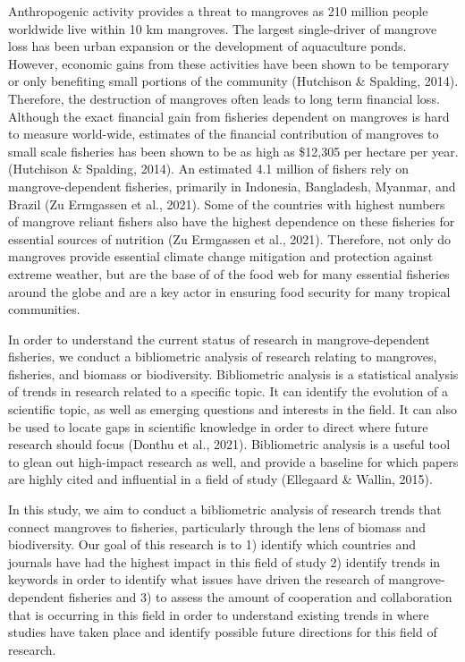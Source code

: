 \documentclass[
  12pt,
]{article}
\begin{document}
Anthropogenic activity provides a threat to mangroves as 210 million people worldwide live within 10 km mangroves. The largest single-driver of mangrove loss has been urban expansion or the development of aquaculture ponds. However, economic gains from these activities have been shown to be temporary or only benefiting small portions of the community (Hutchison \& Spalding, 2014). Therefore, the destruction of mangroves often leads to long term financial loss. Although the exact financial gain from fisheries dependent on mangroves is hard to measure world-wide, estimates of the financial contribution of mangroves to small scale fisheries has been shown to be as high as \$12,305 per hectare per year. (Hutchison \& Spalding, 2014). An estimated 4.1 million of fishers rely on mangrove-dependent fisheries, primarily in Indonesia, Bangladesh, Myanmar, and Brazil (Zu Ermgassen et al., 2021). Some of the countries with highest numbers of mangrove reliant fishers also have the highest dependence on these fisheries for essential sources of nutrition (Zu Ermgassen et al., 2021). Therefore, not only do mangroves provide essential climate change mitigation and protection against extreme weather, but are the base of of the food web for many essential fisheries around the globe and are a key actor in ensuring food security for many tropical communities.

In order to understand the current status of research in mangrove-dependent fisheries, we conduct a bibliometric analysis of research relating to mangroves, fisheries, and biomass or biodiversity. Bibliometric analysis is a statistical analysis of trends in research related to a specific topic. It can identify the evolution of a scientific topic, as well as emerging questions and interests in the field. It can also be used to locate gaps in scientific knowledge in order to direct where future research should focus (Donthu et al., 2021). Bibliometric analysis is a useful tool to glean out high-impact research as well, and provide a baseline for which papers are highly cited and influential in a field of study (Ellegaard \& Wallin, 2015).

In this study, we aim to conduct a bibliometric analysis of research trends that connect mangroves to fisheries, particularly through the lens of biomass and biodiversity. Our goal of this research is to 1) identify which countries and journals have had the highest impact in this field of study 2) identify trends in keywords in order to identify what issues have driven the research of mangrove-dependent fisheries and 3) to assess the amount of cooperation and collaboration that is occurring in this field in order to understand existing trends in where studies have taken place and identify possible future directions for this field of research.
\end{document}

